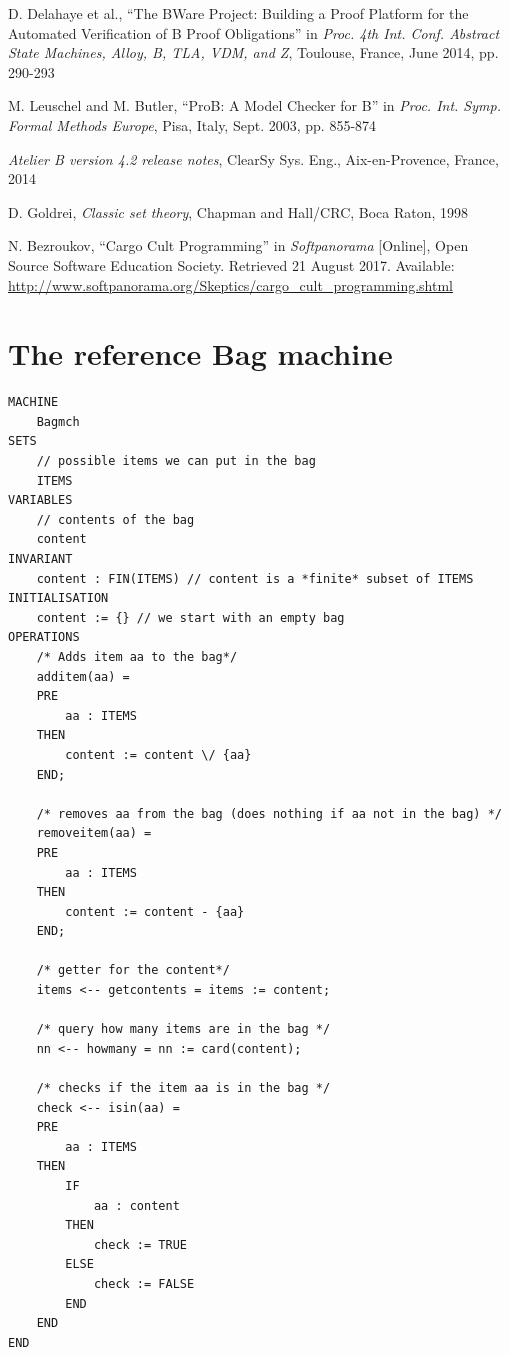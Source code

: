 \documentclass[12pt,journal,duplex]{IEEEtran}
\begin{document}
\begin{thebibliography}{2}
		D. Delahaye et al., ``The BWare Project: Building a Proof Platform for the Automated Verification of B Proof Obligations'' in \emph{Proc. 4th Int. Conf. Abstract State Machines, Alloy, B, TLA, VDM, and Z}, Toulouse, France, June 2014, pp. 290-293

		M. Leuschel and M. Butler, ``ProB: A Model Checker for B'' in \emph{Proc. Int. Symp. Formal Methods Europe}, Pisa, Italy, Sept. 2003, pp. 855-874

		\emph{Atelier B version 4.2 release notes}, ClearSy Sys. Eng., Aix-en-Provence, France, 2014

		D. Goldrei, \emph{Classic set theory}, Chapman and Hall/CRC, Boca Raton, 1998

		N. Bezroukov, ``Cargo Cult Programming'' in \emph{Softpanorama} [Online],  Open Source Software Education Society. Retrieved 21 August 2017. Available: \url{http://www.softpanorama.org/Skeptics/cargo_cult_programming.shtml}










	\end{thebibliography}


	\onecolumn
	\appendices
	\section{The reference Bag machine}
	\begin{lstlisting}
MACHINE
	Bagmch
SETS
	// possible items we can put in the bag
	ITEMS
VARIABLES
	// contents of the bag
	content
INVARIANT
	content : FIN(ITEMS) // content is a *finite* subset of ITEMS
INITIALISATION
	content := {} // we start with an empty bag
OPERATIONS
	/* Adds item aa to the bag*/
	additem(aa) =
	PRE
		aa : ITEMS
	THEN
		content := content \/ {aa}
	END;

	/* removes aa from the bag (does nothing if aa not in the bag) */
	removeitem(aa) =
	PRE
		aa : ITEMS
	THEN
		content := content - {aa}
	END;

	/* getter for the content*/
	items <-- getcontents = items := content;

	/* query how many items are in the bag */
	nn <-- howmany = nn := card(content);

	/* checks if the item aa is in the bag */
	check <-- isin(aa) =
	PRE
		aa : ITEMS
	THEN
		IF
			aa : content
		THEN
			check := TRUE
		ELSE
			check := FALSE
		END
	END
END
\end{lstlisting}
\pagebreak
\end{document}
